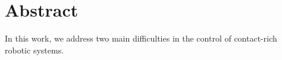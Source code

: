 \chapter*{Abstract}

In this work, we address two main difficulties in the control of contact-rich
robotic systems.
%
